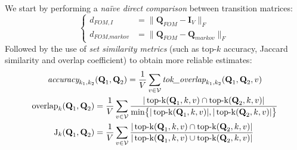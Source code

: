 \documentclass[aspectratio=169, 12pt]{beamer}
\newcommand{\gbm}[1]{\bm{\mathbf{#1}}} %
\begin{document}
    \begin{frame}[plain]{}
        \vspace{0.3cm}
        We start by performing a \emph{naïve direct comparison} between transition matrices:
        \begin{equation*}
            \left\{
                \begin{array}{cl}
                    d_{\textit{FOM},I} &= \| \gbm{Q}_{\textit{FOM}} - \gbm{I}_V \|_F \\
                    d_{\textit{FOM},\textit{markov}} &= \| \gbm{Q}_{\textit{FOM}} - \gbm{Q}_{\textit{markov}} \|_F
                \end{array}
            \right.
        \end{equation*}
        Followed by the use of \emph{set similarity metrics} (such as top-$k$ accuracy, Jaccard similarity and overlap coefficient) to obtain more reliable estimates:
        \begin{equation*}
            \begin{gathered}
                \textit{accuracy}_{k_1,k_2}(\gbm{Q}_1, \gbm{Q}_2) = \frac{1}{V} \sum_{v \in \mathcal{V}}{\textit{tok\_overlap}_{k_1,k_2}(\gbm{Q}_1, \gbm{Q}_2, v)} \\
                \begin{aligned}
                    \operatorname{overlap}_k(\gbm{Q}_1, \gbm{Q}_2) &= \frac{1}{V}\sum_{v \in \mathcal{V}}{\frac{|\operatorname{top-k}(\gbm{Q}_1, k, v) \cap \operatorname{top-k}(\gbm{Q}_2, k, v)|}{\operatornamewithlimits{min}\bigl\{|\operatorname{top-k}(\gbm{Q}_1, k, v)|, |\operatorname{top-k}(\gbm{Q}_2, k, v)|\bigr\}}} \\
                    \operatorname{J}_k(\gbm{Q}_1, \gbm{Q}_2) &= \frac{1}{V}\sum_{v \in \mathcal{V}}{\frac{|\operatorname{top-k}(\gbm{Q}_1, k, v) \cap \operatorname{top-k}(\gbm{Q}_2, k, v)|}{|\operatorname{top-k}(\gbm{Q}_1, k, v) \cup \operatorname{top-k}(\gbm{Q}_2, k, v)|}} \\
                \end{aligned}
            \end{gathered}
        \end{equation*}
    \end{frame}
\end{document}
